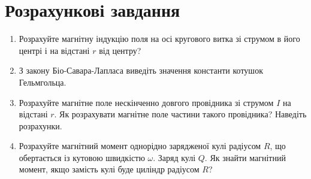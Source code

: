 \section*{Розрахункові завдання}

\begin{enumerate}
	\item Розрахуйте магнітну індукцію поля на осі кругового витка зі струмом в його центрі і на відстані $r$ від центру?
	\item З закону Біо-Савара-Лапласа виведіть значення константи котушок Гельмгольца.
	\item Розрахуйте магнітне поле нескінченно довгого провідника зі струмом $I$ на відстані $r$. Як розрахувати магнітне поле частини такого провідника? Наведіть розрахунки.
	\item Розрахуйте магнітний момент однорідно зарядженої кулі радіусом $R$, що обертається із кутовою швидкістю $\omega$. Заряд кулі $Q$. Як знайти магнітний момент, якщо замість кулі буде циліндр радіусом $R$?
\end{enumerate}
